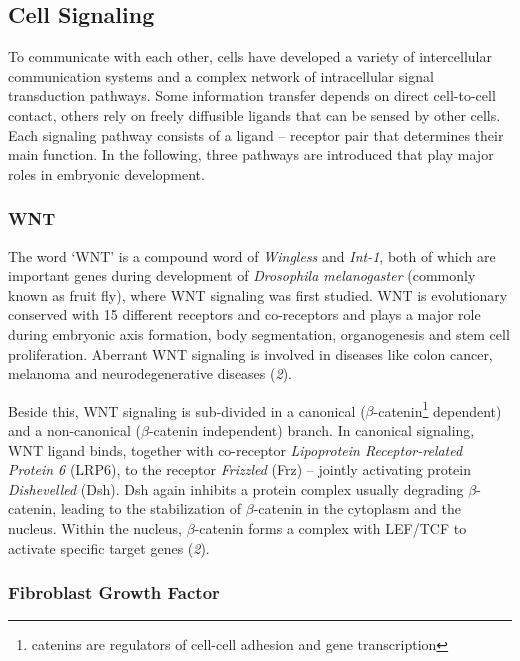 \documentclass[11pt,singlespacinge,twoside]{reedthesis} %
\theoremstyle{definition}
\theoremstyle{definition}
\theoremstyle{definition}
\theoremstyle{remark}
\begin{document}
\hypertarget{cell-signaling}{%
\subsection{Cell Signaling}\label{cell-signaling}}

To communicate with each other, cells have developed a variety of intercellular communication systems and a complex network of intracellular signal transduction pathways. Some information transfer depends on direct cell-to-cell contact, others rely on freely diffusible ligands that can be sensed by other cells. Each signaling pathway consists of a ligand -- receptor pair that determines their main function. In the following, three pathways are introduced that play major roles in embryonic development.

\hypertarget{wnt}{%
\subsubsection{WNT}\label{wnt}}

The word `WNT' is a compound word of \emph{Wingless} and \emph{Int-1}, both of which are important genes during development of \emph{Drosophila melanogaster} (commonly known as fruit fly), where WNT signaling was first studied. WNT is evolutionary conserved with 15 different receptors and co-receptors and plays a major role during embryonic axis formation, body segmentation, organogenesis and stem cell proliferation. Aberrant WNT signaling is involved in diseases like colon cancer, melanoma and neurodegenerative diseases (\emph{2}).

Beside this, WNT signaling is sub-divided in a canonical (\(\beta\)-catenin\footnote{catenins are regulators of cell-cell adhesion and gene transcription} dependent) and a non-canonical (\(\beta\)-catenin independent) branch. In canonical signaling, WNT ligand binds, together with co-receptor \emph{Lipoprotein Receptor-related Protein 6} (LRP6), to the receptor \emph{Frizzled} (Frz) -- jointly activating protein \emph{Dishevelled} (Dsh). Dsh again inhibits a protein complex usually degrading \(\beta\)-catenin, leading to the stabilization of \(\beta\)-catenin in the cytoplasm and the nucleus. Within the nucleus, \(\beta\)-catenin forms a complex with LEF/TCF to activate specific target genes (\emph{2}).

\hypertarget{intro-FGF}{%
\subsubsection{Fibroblast Growth Factor}\label{intro-FGF}}
\end{document}
